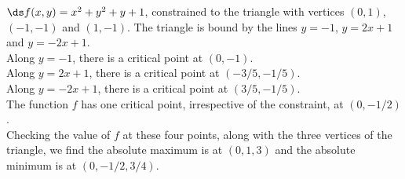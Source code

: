 {$\ds f(x,y) = x^2+y^2+y+1$, constrained to the triangle with vertices $(0,1)$, $(-1,-1)$ and $(1,-1)$.
}
{The triangle is bound by the lines $y=-1$, $y=2x+1$ and $y=-2x+1$.\\
Along $y=-1$, there is a critical point at $(0,-1)$.\\
Along $y=2x+1$, there is a critical point at $(-3/5,-1/5)$.\\
Along $y=-2x+1$, there is a critical point at $(3/5,-1/5)$.\\
The function $f$ has one critical point, irrespective of the constraint, at $(0,-1/2)$.\\
Checking the value of $f$ at these four points, along with the three vertices of the triangle, we find the absolute maximum is at $(0,1,3)$ and the absolute minimum is at $(0,-1/2,3/4)$.
}